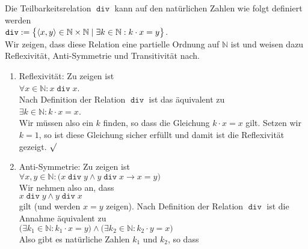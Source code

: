 \example 
Die Teilbarkeitsrelation $\mathop{\mathtt{div}}$ kann auf den nat\"{u}rlichen Zahlen
wie folgt definiert werden 
\\[0.2cm]
\hspace*{1.3cm}
$ \mathop{\mathtt{div}} := 
   \bigl\{ \pair(x,y) \in \mathbb{N} \times \mathbb{N} \mid \exists k \in \mathbb{N}: k \cdot x = y\bigr\}$.
\\[0.2cm] 
Wir zeigen, dass diese Relation eine partielle Ordnung auf $\mathbb{N}$ ist und weisen dazu
Reflexivit\"{a}t, Anti-Symmetrie und Transitivit\"{a}t nach.
\begin{enumerate}
\item Reflexivit\"{a}t: Zu zeigen ist 
      \\[0.2cm]
      \hspace*{1.3cm}
      $\forall x \in \mathbb{N}: x \mathop{\mathtt{div}} x$.
      \\[0.2cm]
      Nach Definition der Relation $\mathop{\mathtt{div}}$ ist  das \"{a}quivalent zu
      \\[0.2cm]
      \hspace*{1.3cm}
      $\exists k \in \mathbb{N}: k \cdot x = x$. 
      \\[0.2cm]
      Wir m\"{u}ssen also ein $k$ finden, so dass die Gleichung $k \cdot x = x$ gilt.
      Setzen wir $k=1$, so ist diese Gleichung sicher erf\"{u}llt und damit ist die Reflexivit\"{a}t
      gezeigt. $\surd$
\item Anti-Symmetrie: Zu zeigen ist 
      \\[0.2cm]
      \hspace*{1.3cm}
      $\forall x, y \in \mathbb{N}:\bigl( x \mathop{\mathtt{div}} y \wedge y \mathop{\mathtt{div}} x \rightarrow x = y\bigr)$
      \\[0.2cm] 
      Wir nehmen also an, dass 
      \\[0.2cm]
      \hspace*{1.3cm}
      $x \mathop{\mathtt{div}} y \wedge y \mathop{\mathtt{div}} x$
      \\[0.2cm]
      gilt (und werden $x=y$ zeigen).  Nach Definition der Relation $\mathop{\mathtt{div}}$
      ist die Annahme \"{a}quivalent zu 
      \\[0.2cm]
      \hspace*{1.3cm}
      $\bigl(\exists k_1 \in \mathbb{N}: k_1 \cdot x = y \bigr) \wedge
       \bigl(\exists k_2 \in \mathbb{N}: k_2 \cdot y = x \bigr)$ 
      \\[0.2cm]
      Also gibt es nat\"{u}rliche Zahlen $k_1$ und $k_2$, so dass 

\end{enumerate}
